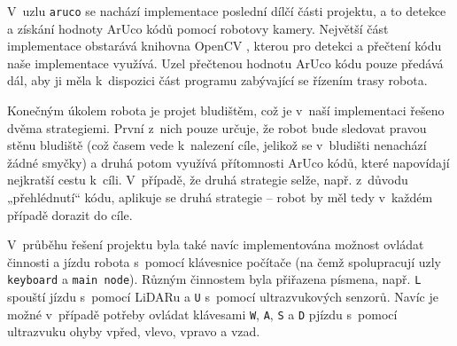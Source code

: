 V~uzlu \texttt{aruco} se nachází implementace poslední dílčí části projektu, a to detekce a získání hodnoty ArUco kódů pomocí robotovy kamery. Největší část implementace obstarává knihovna OpenCV \cite{opencv}, kterou pro detekci a přečtení kódu naše implementace využívá. Uzel přečtenou hodnotu ArUco kódu pouze předává dál, aby ji měla k~dispozici část programu zabývající se řízením trasy robota.

Konečným úkolem robota je projet bludištěm, což je v~naší implementaci řešeno dvěma strategiemi. První z~nich pouze určuje, že robot bude sledovat pravou stěnu bludiště (což časem vede k~nalezení cíle, jelikož se v~bludišti nenachází žádné smyčky) a druhá potom využívá přítomnosti ArUco kódů, které napovídají nejkratší cestu k~cíli. V~případě, že druhá strategie selže, např. z~důvodu „přehlédnutí“ kódu, aplikuje se druhá strategie – robot by měl tedy v~každém případě dorazit do cíle.

V~průběhu řešení projektu byla také navíc implementována možnost ovládat činnosti a jízdu robota s~pomocí klávesnice počítače (na čemž spolupracují uzly \texttt{keyboard} a \texttt{main node}). Různým činnostem byla přiřazena písmena, např. \texttt{L} spouští jízdu s~pomocí LiDARu a \texttt{U} s~pomocí ultrazvukových senzorů. Navíc je možné v~případě potřeby ovládat klávesami \texttt{W}, \texttt{A}, \texttt{S} a \texttt{D} pjízdu s~pomocí ultrazvuku ohyby vpřed, vlevo, vpravo a vzad.
